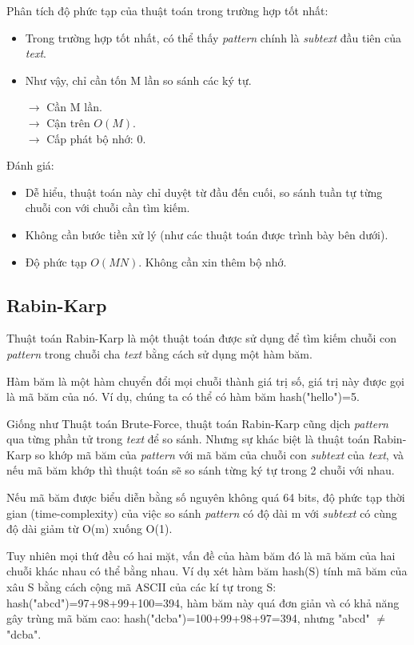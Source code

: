 \documentclass[a4paper,11pt]{article}
\begin{document}
\begin{enumerate}
			Phân tích độ phức tạp của thuật toán trong trường hợp tốt nhất:
			\begin{itemize}
				\item Trong trường hợp tốt nhất, có thể thấy \textit{pattern} chính là \textit{subtext} đầu tiên của \textit{text}.
				\item Như vậy, chỉ cần tốn M lần so sánh các ký tự.
				
				$\to$ Cần M lần. \\
				$\to$ Cận trên $O(M)$. \\
				$\to$ Cấp phát bộ nhớ: 0.
			\end{itemize}
			
			Đánh giá:
			\begin{itemize}
				\item Dễ hiểu, thuật toán này chỉ duyệt từ đầu đến cuối, so sánh tuần tự từng chuỗi con với chuỗi cần tìm kiếm.
				\item Không cần bước tiền xử lý (như các thuật toán được trình bày bên dưới).
				\item Độ phức tạp $O(MN)$. Không cần xin thêm bộ nhớ.
			\end{itemize}

		\subsection {Rabin-Karp}

			Thuật toán Rabin-Karp là một thuật toán được sử dụng để tìm kiếm
			chuỗi con \textit{pattern} trong chuỗi cha \textit{text} bằng cách sử dụng một hàm băm.

			Hàm băm là một hàm chuyển đổi mọi chuỗi thành giá trị số, giá trị này được gọi là mã băm của nó. Ví dụ, chúng ta có thể có hàm băm hash("hello")=5.

			Giống như Thuật toán Brute-Force, thuật toán Rabin-Karp cũng dịch \textit{pattern} 
			qua từng phần tử trong \textit{text} để so sánh.
			Nhưng sự khác biệt là thuật toán Rabin-Karp so khớp mã băm của \textit{pattern} 
			với mã băm của chuỗi con \textit{subtext} của \textit{text}, và nếu mã băm khớp thì thuật toán sẽ so sánh từng ký tự trong 2 chuỗi với nhau.

			Nếu mã băm được biểu diễn bằng số nguyên không quá 64 bits, độ phức tạp thời gian (time-complexity) 
			của việc so sánh \textit{pattern} có độ dài m với \textit{subtext} có cùng độ dài giảm từ O(m) xuống O(1).

			Tuy nhiên mọi thứ đều có hai mặt, vấn đề của hàm băm đó là mã băm của hai chuỗi khác nhau có thể bằng nhau. 
			Ví dụ xét hàm băm hash(S) tính mã băm của xâu S bằng cách cộng mã ASCII của các kí tự trong S: hash("abcd")=97+98+99+100=394, hàm băm này quá đơn giản và có khả năng gây trùng mã băm cao: hash("dcba")=100+99+98+97=394, nhưng "abcd" $\neq$ "dcba".


\end{enumerate}
\end{document}
